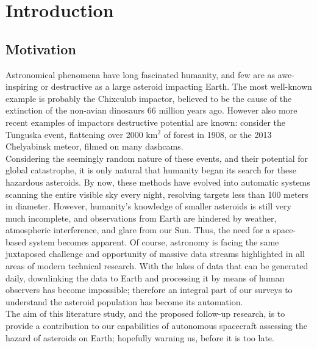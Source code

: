 \chapter{Introduction}
\label{ch:Introduction}

\section{Motivation}

Astronomical phenomena have long fascinated humanity, and few are as awe-inspiring or destructive as a large asteroid impacting Earth. The most well-known example is probably the Chixculub impactor, believed to be the cause of the extinction of the non-avian dinosaurs 66 million years ago. However also more recent examples of impactors destructive potential are known: consider the Tunguska event, flattening over 2000 km$^2$ of forest in 1908, or the 2013 Chelyabinsk meteor, filmed on many dashcams. \\

Considering the seemingly random nature of these events, and their potential for global catastrophe, it is only natural that humanity began its search for these hazardous asteroids. By now, these methods have evolved into automatic systems scanning the entire visible sky every night, resolving targets less than 100 meters in diameter. However, humanity's knowledge of smaller asteroids is still very much incomplete, and observations from Earth are hindered by weather, atmospheric interference, and glare from our Sun. Thus, the need for a space-based system becomes apparent. Of course, astronomy is facing the same juxtaposed challenge and opportunity of massive data streams highlighted in all areas of modern technical research. With the lakes of data that can be generated daily, downlinking the data to Earth and processing it by means of human observers has become impossible; therefore an integral part of our surveys to understand the asteroid population has become its automation.\\

The aim of this literature study, and the proposed follow-up research, is to provide a contribution to our capabilities of autonomous spacecraft assessing the hazard of asteroids on Earth; hopefully warning us, before it is too late.

